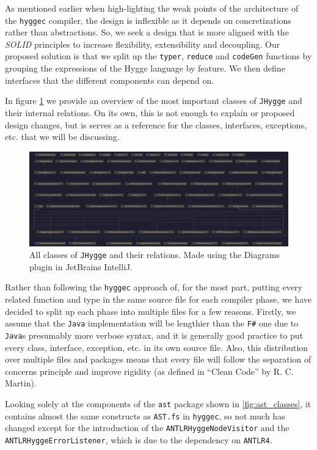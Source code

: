 As mentioned earlier when high-lighting the weak points of the architecture of the \texttt{hyggec} compiler, the design is inflexible as it
depends on concretizations rather than abstractions. So, we seek a design that is more aligned with the \textit{SOLID} principles
to increase flexibility, extensibility and decoupling. Our proposed solution is that we split up the \texttt{typer}, \texttt{reduce}
and \texttt{codeGen} functions by grouping the expressions of the Hygge language by feature. We then define interfaces that the
different components can depend on.

In figure \ref{fig:jhygge_all_classes} we provide an
overview of the most important classes of \texttt{JHygge} and their internal relations. On its own, this is not enough to explain or proposed design
changes, but is serves as a reference for the classes, interfaces, exceptions, etc. that we will be discussing.

\begin{figure}[H]
\centering
\includegraphics[width=\textwidth]{Pictures/Diagrams/jhygge_all_classes.png}
\caption{All classes of \texttt{JHygge} and their relations. Made using the Diagrams plugin in JetBrains IntelliJ.}
\label{fig:jhygge_all_classes}
\end{figure}

Rather than following the \texttt{hyggec} approach of, for the most part, putting every related function and type in the same source file
for each compiler phase, we have decided to split up each phase into multiple files for a few reasons. Firstly, we assume that the \texttt{Java}
implementation will be lengthier than the \texttt{F\#} one due to \texttt{Java}s presumably more verbose syntax, and it is generally good
practice to put every class, interface, exception, etc. in its own source file. Also, this distribution over multiple files and packages
means that every file will follow the separation of concerns principle and improve rigidity (as defined in ``Clean Code'' by R. C. Martin). 

Looking solely at the components of the \texttt{ast} package shown in \ref{fig:ast_classes}, it contains almost the same constructs as \texttt{AST.fs} in \texttt{hyggec}, so not much has changed
except for the introduction of the \texttt{ANTLRHyggeNodeVisitor} and the \texttt{ANTLRHyggeErrorListener}, which is due to the dependency on \texttt{ANTLR4}.

